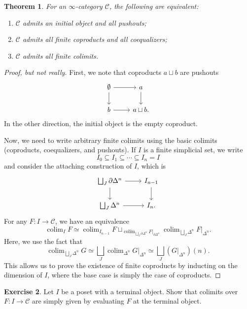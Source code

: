 \documentclass[10pt, oneside]{memoir}
\newtheorem{thm}{Theorem}[subsection]
\theoremstyle{definition}
\newtheorem{exer}[thm]{Exercise}
\theoremstyle{remark}
\theoremstyle{plain}
\theoremstyle{definition}
\theoremstyle{remark}
\newcommand{\mc}[1]{\mathcal{#1}}
\newcommand{\1}{\mathbf{1}}
\newcommand{\2}{\mathbf{2}}
\newcommand{\3}{\mathbf{3}}
\DeclareMathOperator*{\colim}{colim}
\begin{document}
\begin{thm}
    For an $\infty$-category $\mc{C}$, the following are equivalent:
    \begin{enumerate}
        \item $\mc{C}$ admits an initial object and all pushouts;
        \item $\mc{C}$ admits all finite coproducts and all coequalizers;
        \item $\mc{C}$ admits all finite colimits.
    \end{enumerate}
\end{thm}

\begin{proof}[Proof, but not really]
    First, we note that coproducts $a \sqcup b$ are pushouts
    \begin{equation*}
    \begin{tikzcd}
        \emptyset \ar{r} \ar{d} & a \ar{d} \\
        b \ar{r} & a \sqcup b.
    \end{tikzcd}
    \end{equation*}
    In the other direction, the initial object is the empty coproduct.

    Now, we need to write arbitrary finite colimits using the basic colimits (coproducts, coequalizers, and pushouts). If $I$ is a finite simplicial set, we write
    \[ I_0 \subseteq I_1 \subseteq \cdots \subseteq I_n = I \]
    and consider the attaching construction of $I$, which is
    \begin{equation*}
    \begin{tikzcd}
        \bigsqcup_J \partial \Delta^n \ar{r} \ar{d} & I_{n-1} \ar{d} \\
        \bigsqcup_J \Delta^n \ar{r} & I_n.
    \end{tikzcd}
    \end{equation*}
    For any $F \colon I \to \mc{C}$, we have an equivalence
    \[ \colim_I F \simeq \colim_{I_{n-1}} F \sqcup_{\colim_{\bigsqcup_J \partial \Delta^n} F|_{\partial \Delta^n}} \colim_{\bigsqcup_J \Delta^n} F|_{\Delta^n}. \]
    Here, we use the fact that
    \[ \colim_{\bigsqcup_J \Delta^n} G \simeq \bigsqcup_J \colim_{\Delta^n} G|_{\Delta^n} \simeq \bigsqcup_J (G|_{\Delta^n})(n). \]
    This allows us to prove the existence of finite coproducts by inducting on the dimension of $I$, where the base case is simply the case of coproducts.
\end{proof}

\begin{exer}
    Let $I$ be a poset with a terminal object. Show that colimits over $F \colon I \to \mc{C}$ are simply given by evaluating $F$ at the terminal object.
\end{exer}
\end{document}
